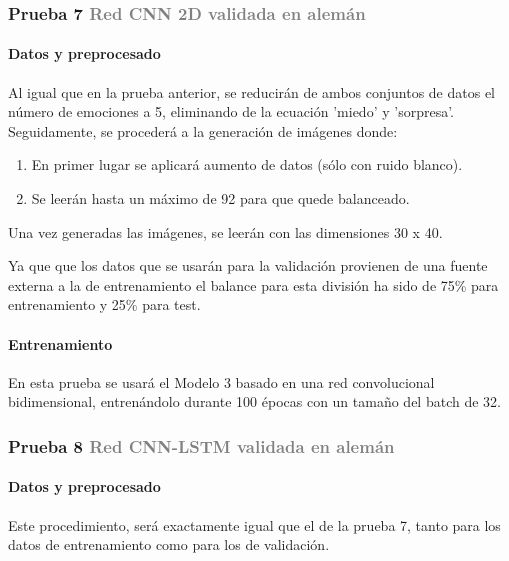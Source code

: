 \documentclass[11pt,a4paper,spanish]{book}
\begin{document}
	\subsubsection[]{\large Prueba 7 {\normalsize \textcolor{Gray}{Red CNN 2D validada en alemán}}}
	
	\hfill\begin{minipage}{\dimexpr\textwidth-1cm}
		\paragraph{Datos y preprocesado} Al igual que en la prueba anterior, se reducirán de ambos conjuntos de datos el número de emociones a 5, eliminando de la ecuación 'miedo' y 'sorpresa'. Seguidamente, se procederá a la generación de imágenes donde:
		\begin{enumerate}
			\item En primer lugar se aplicará aumento de datos (sólo con ruido blanco).
			\item Se leerán hasta un máximo de 92 para que quede balanceado.
		\end{enumerate}
		Una vez generadas las imágenes, se leerán con las dimensiones 30 x 40.
		
		Ya que que los datos que se usarán para la validación provienen de una fuente externa a la de entrenamiento el balance para esta división ha sido de 75\% para entrenamiento y 25\% para test. 
	
		\paragraph{Entrenamiento} En esta prueba se usará el Modelo 3 basado en una red convolucional bidimensional, entrenándolo durante 100 épocas con un tamaño del batch de 32.
		
	\end{minipage}

	\subsubsection[]{\large Prueba 8 {\normalsize \textcolor{Gray}{Red CNN-LSTM validada en alemán}}}
	\setlength{\leftskip}{1cm}
		
		\paragraph{Datos y preprocesado}  Este procedimiento, será exactamente igual que el de la prueba 7, tanto para los datos de entrenamiento como para los de validación.
		
\end{document}
